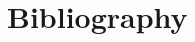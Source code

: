 \documentclass[10pt,twoside]{book}
\begin{document}
% 

% 

\chapter{Bibliography}
\clearpage
\begin{multicols}{2}
\printbibliography[heading=none]
\end{multicols}

% 
\end{document}
